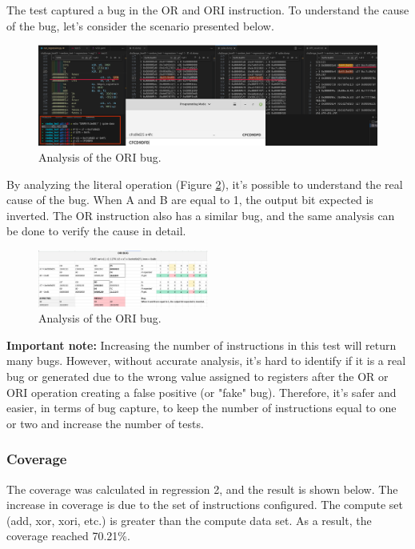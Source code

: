 The test captured a bug in the OR and ORI instruction. To understand the cause of the bug, let's consider the scenario presented below.

\begin{figure}
    \centering
    \includegraphics[width=1\textwidth]{./c3l1_img/ori_bug_anal2.png}
    \caption{Analysis of the ORI bug.}
    \label{fig:ori_bug_anal2}
\end{figure}

By analyzing the literal operation (Figure \ref{fig:ori_bug_anal}), it's possible to understand the real cause of the bug. When A and B are equal to 1, the output bit expected is inverted. The OR instruction also has a similar bug, and the same analysis can be done to verify the cause in detail.

\begin{figure}[H]
    \centering
    \includegraphics[width=0.5\textwidth]{./c3l1_img/ori_bug_anal.png}
    \caption{Analysis of the ORI bug.}
    \label{fig:ori_bug_anal}
\end{figure}

\textbf{Important note: }Increasing the number of instructions in this test will return many bugs. However, without accurate analysis, it's hard to identify if it is a real bug or generated due to the wrong value assigned to registers after the OR or ORI operation creating a false positive (or "fake" bug). Therefore, it's safer and easier, in terms of bug capture, to keep the number of instructions equal to one or two and increase the number of tests.

\subsubsection{Coverage}

The coverage was calculated in regression 2, and the result is shown below. The increase in coverage is due to the set of instructions configured. The compute set (add, xor, xori, etc.) is greater than the compute data set. As a result, the coverage reached 70.21\%.

